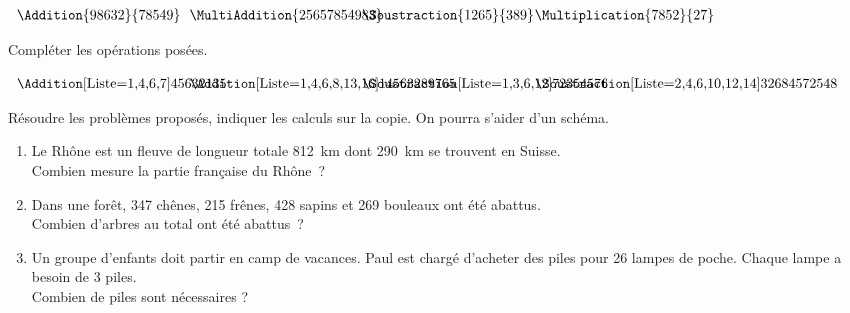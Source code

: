 \documentclass[a4paper]{book}
\begin{document}
{\begin{exercice}
        $\begin{array}{p{4cm}p{4cm}p{4cm}p{4cm}}
            \Addition{98632}{78549}
            & \MultiAddition{{2565}{7854}{983}}
            & \Soustraction{1265}{389}
            & \Multiplication{7852}{27}
        \end{array}$
    \end{exercice}


    \begin{exercice}
        Compléter les opérations posées.

        $\begin{array}{p{4cm}p{4cm}p{4cm}p{4cm}}
            \Addition[Liste={1,4,6,7}]{4563}{2135}
            & \Addition[Liste={1,4,6,8,13,16}]{145632}{89765}
            & \Soustraction[Liste={1,3,6,12}]{7235}{4576}
            & \Soustraction[Liste={2,4,6,10,12,14}]{326845}{72548}
        \end{array}$
    \end{exercice}


    \begin{exercice}
        Résoudre les problèmes proposés, indiquer les calculs sur la copie. On pourra s'aider d'un schéma.

        \begin{enumerate}
            \item Le Rhône est un fleuve de longueur totale 812~km dont 290~km se trouvent en Suisse. \\
            Combien mesure la partie française du Rhône~?

            \points[123]

            \item Dans une forêt, 347 chênes, 215 frênes, 428 sapins et 269 bouleaux ont été abattus. \\
            Combien d'arbres au total ont été abattus~?

            \points[123]


\newpage


            \item Un groupe d’enfants doit partir en camp de vacances. Paul est chargé d’acheter des piles pour 26 lampes de poche. Chaque lampe a besoin de 3 piles.\\
            Combien de piles sont nécessaires ?

            \points[123]
        \end{enumerate}
    \end{exercice}


}
\end{document}
